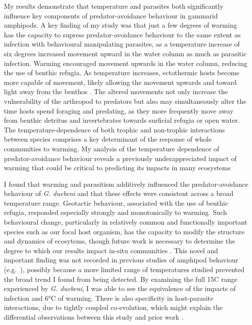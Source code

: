 My results demonstrate that temperature and parasites both significantly influence key components of predator-avoidance behaviour in gammarid amphipods. A key finding of my study was that just a few degrees of warming has the capacity to supress predator-avoidance behaviour to the same extent as infection with behavioural manipulating parasites, as a temperature increase of six degrees increased movement upward in the water column as much as parasitic infection. Warming encouraged movement upwards in the water column, reducing the use of benthic refugia. As temperature increases, ectothermic hosts become more capable of movement, likely allowing the movement upwards and toward light away from the benthos \citep{pawar2016, abram2017}. The altered movements not only increase the vulnerability of the arthropod to predators \citep{perrot2012} but also may simultaneously alter the time hosts spend foraging and predating, as they more frequently move away from benthic detritus and invertebrates towards surficial refugia or open water. The temperature-dependence of both trophic \citep{uszko2017} and non-trophic \citep{kordas2017} interactions between species comprises a key determinant of the response of whole communities to warming. My analysis of the temperature dependence of predator-avoidance behaviour reveals a previously underappreciated impact of warming that could be critical to predicting its impacts in many ecosystems

I found that warming and parasitism additively influenced the predator-avoidance behaviour of \emph{G. duebeni} and that these effects were consistent across a broad temperature range. Geotactic behaviour, associated with the use of benthic refugia, responded especially strongly and monotonically to warming. Such behavioural change, particularly in relatively common and functionally important species such as our focal host organism, has the capacity to modify the structure and dynamics of ecosytems, though future work is necessary to determine the degree to which our results impact in-situ communities \citep{kefi2015, kefi2016, suraci2016, donohue2017}. This novel and important finding was not recorded in previous studies of amphipod behaviour (e.g.\ \citet{labaude2017}), possibly because a more limited range of temperatures studied prevented the broad trend I found from being detected. By examining the full 15\degree C range experienced by \emph{G. duebeni}, I was able to see the equivalence of the impacts of infection and 6°C of warming. There is also specificity in host-parasite interactions, due to tightly coupled co-evolution, which might explain the differential observations between this study and prior work \citep{omahony2004, westram2011}. 


